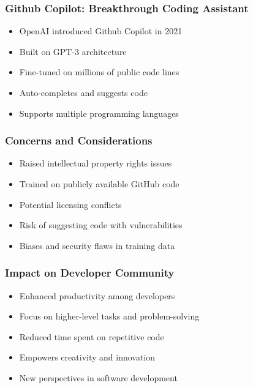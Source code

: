\begin{frame}[fragile]\frametitle{Github Copilot: Breakthrough Coding Assistant}
    
    \begin{itemize}
        \item OpenAI introduced Github Copilot in 2021
        \item Built on GPT-3 architecture
        \item Fine-tuned on millions of public code lines
        \item Auto-completes and suggests code
        \item Supports multiple programming languages
    \end{itemize}
\end{frame}

\begin{frame}[fragile]\frametitle{Concerns and Considerations}
    
    \begin{itemize}
        \item Raised intellectual property rights issues
        \item Trained on publicly available GitHub code
        \item Potential licensing conflicts
        \item Risk of suggesting code with vulnerabilities
        \item Biases and security flaws in training data
    \end{itemize}
\end{frame}

\begin{frame}[fragile]\frametitle{Impact on Developer Community}
    
    \begin{itemize}
        \item Enhanced productivity among developers
        \item Focus on higher-level tasks and problem-solving
        \item Reduced time spent on repetitive code
        \item Empowers creativity and innovation
        \item New perspectives in software development
    \end{itemize}
\end{frame}

